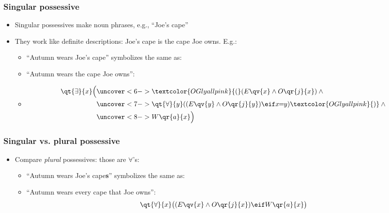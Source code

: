 \begin{frame}
  \frametitle{Singular possessive}

  \begin{itemize}[<+->]
    \item Singular possessives make noun phrases, e.g., ``Joe's cape''
    \item They work like definite descriptions: Joe's cape is the cape Joe owns.
    E.g.:
    \begin{itemize}
      \item ``Autumn wears \alert{Joe's cape}'' symbolizes the same as:
      \item[] ``Autumn wears \alert{the cape Joe owns}'':
      \item[]
      \begin{align*}
        \qt{\exists}{x}\Big(& \uncover<6->{\textcolor{OGlyallpink}{(}(E\qv{x} \land O\qr{j}{x}) \land {}}\\
        & \uncover<7->{\qt{\forall}{y}((E\qv{y} \land O\qr{j}{y}) \eif x\!\!=\!\!y)\textcolor{OGlyallpink}{)} \land {}}\\
        & \uncover<8->{W\qr{a}{x}\Big)}
      \end{align*}
    \end{itemize}
  \end{itemize}
\end{frame}

\begin{frame}
  \frametitle{Singular vs. plural possessive}

  \begin{itemize}[<+->]
    \item Compare \emph{plural} possessives: those are $\forall$'s:
    \bigskip
    \begin{itemize}[<+->]
      \item ``Autumn wears \alert{Joe's cape\textbf{s}}'' symbolizes the same
      as:
      \item[] ``Autumn wears every cape that Joe owns'':
      \[\qt{\forall}{x}\big((E\qv{x} \land O\qr{j}{x}) \eif W\qr{a}{x}\big)\]
    \end{itemize}
  \end{itemize}
\end{frame}



